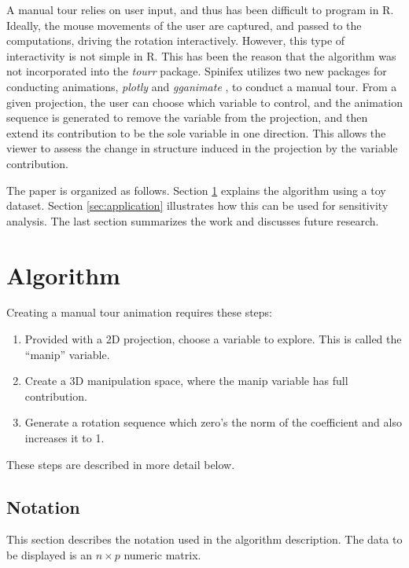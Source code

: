 \documentclass{monashthesis}
\begin{document}
A manual tour relies on user input, and thus has been difficult to
program in R. Ideally, the mouse movements of the user are captured, and
passed to the computations, driving the rotation interactively. However,
this type of interactivity is not simple in R. This has been the reason
that the algorithm was not incorporated into the \emph{tourr} package.
Spinifex utilizes two new packages for conducting animations,
\emph{plotly} \autocite{sievert_plotly_2018} and \emph{gganimate}
\autocite{pedersen_gganimate:_2019}, to conduct a manual tour. From a
given projection, the user can choose which variable to control, and the
animation sequence is generated to remove the variable from the
projection, and then extend its contribution to be the sole variable in
one direction. This allows the viewer to assess the change in structure
induced in the projection by the variable contribution.

The paper is organized as follows. Section \ref{sec:algorithm} explains
the algorithm using a toy dataset. Section \ref{sec:application}
illustrates how this can be used for sensitivity analysis. The last
section summarizes the work and discusses future research.

\section{Algorithm}\label{sec:algorithm}

Creating a manual tour animation requires these steps:

\begin{enumerate}
\def\labelenumi{\arabic{enumi}.}
\tightlist
\item
  Provided with a 2D projection, choose a variable to explore. This is
  called the ``manip'' variable.
\item
  Create a 3D manipulation space, where the manip variable has full
  contribution.
\item
  Generate a rotation sequence which zero's the norm of the coefficient
  and also increases it to 1.
\end{enumerate}

These steps are described in more detail below.

\subsection{Notation}\label{notation}

This section describes the notation used in the algorithm description.
The data to be displayed is an \(n \times p\) numeric matrix.
\end{document}
